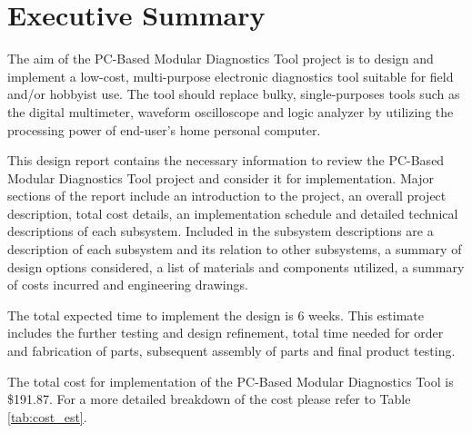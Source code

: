\section*{Executive Summary}
The aim of the PC-Based Modular Diagnostics Tool project is to design and implement
a low-cost, multi-purpose electronic diagnostics tool suitable for field and/or
hobbyist use. The tool should replace bulky, single-purposes tools such as the digital 
multimeter, waveform oscilloscope and logic analyzer by utilizing the processing
power of end-user's home personal computer.

This design report contains the necessary information to review the PC-Based Modular 
Diagnostics Tool project and consider it for implementation. Major sections of the
report include an introduction to the project, an overall project description,
total cost details, an implementation schedule and detailed technical descriptions of each
subsystem. Included in the subsystem descriptions are a description of each subsystem
and its relation to other subsystems, a summary of design options considered, a list 
of materials and components utilized, a summary of costs incurred and engineering drawings.

The total expected time to implement the design is 6 weeks. This estimate includes the 
further testing and design refinement, total time needed for order and fabrication of parts, 
subsequent assembly of parts and final product testing.

The total cost for implementation of the PC-Based Modular Diagnostics Tool is \$191.87. For a more detailed breakdown of the cost please refer to Table \ref{tab:cost_est}.
